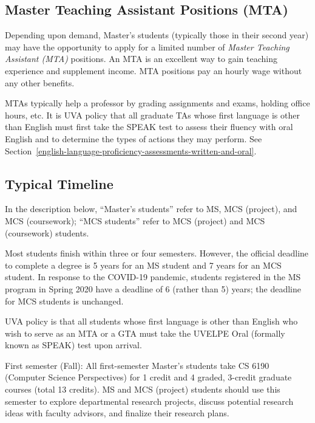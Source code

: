 \hypertarget{master-teaching-assistant-positions-mta}{%
\subsection{Master Teaching Assistant Positions
(MTA)}\label{master-teaching-assistant-positions-mta}}

Depending upon demand, Master's students (typically those in their
second year) may have the opportunity to apply for a limited number of
\emph{Master Teaching Assistant (MTA)} positions. An MTA is an excellent
way to gain teaching experience and supplement income. MTA positions pay
an hourly wage without any other benefits.

MTAs typically help a professor by grading assignments and exams,
holding office hours, etc. It is UVA policy that all graduate TAs whose
first language is other than English must first take the SPEAK test to
assess their fluency with oral English and to determine the types of
actions they may perform.
See Section~\ref{english-language-proficiency-assessments-written-and-oral}.

\hypertarget{typical-timeline}{%
\subsection{Typical Timeline}\label{typical-timeline}}

In the description below, ``Master's students'' refer to MS, MCS
(project), and MCS (coursework); ``MCS students'' refer to
MCS (project) and MCS (coursework) students.

Most students finish within three or four semesters. However, the
official deadline to complete a degree is 5 years for an MS student and
7 years for an MCS student. In response to the COVID-19 pandemic,
students registered in the MS program in Spring 2020 have a deadline of
6 (rather than 5) years; the deadline for MCS students is unchanged.

UVA policy is that all students whose first language is other than
English who wish to serve as an MTA or a GTA must take the UVELPE Oral
(formally known as SPEAK) test upon arrival.

{First semester (Fall):} All first-semester Master's students take CS
6190 (Computer Science Perspectives) for 1 credit and 4 graded, 3-credit
graduate courses (total 13 credits). MS and MCS (project) students should use this semester to explore departmental research projects, discuss potential research ideas with faculty advisors, and finalize their research plans.

